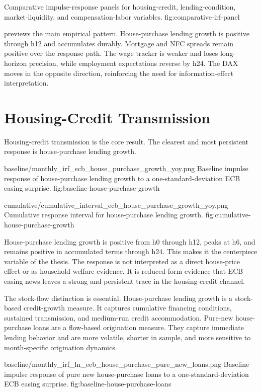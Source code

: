   {Comparative impulse-response panels for housing-credit, lending-condition, market-liquidity, and compensation-labor variables.}
  {fig:comparative-irf-panel}

 previews the main empirical pattern. House-purchase lending growth is positive through h12 and accumulates durably. Mortgage and NFC spreads remain positive over the response path. The wage tracker is weaker and loses long-horizon precision, while employment expectations reverse by h24. The DAX moves in the opposite direction, reinforcing the need for information-effect interpretation.

\section{Housing-Credit Transmission}

Housing-credit transmission is the core result. The clearest and most persistent response is house-purchase lending growth.

\thesisfigure
  {baseline/monthly_irf_ecb_house_purchase_growth_yoy.png}
  {Baseline impulse response of house-purchase lending growth to a one-standard-deviation ECB easing surprise.}
  {fig:baseline-house-purchase-growth}

\thesisfigure
  {cumulative/cumulative_interval_ecb_house_purchase_growth_yoy.png}
  {Cumulative response interval for house-purchase lending growth.}
  {fig:cumulative-house-purchase-growth}

House-purchase lending growth is positive from h0 through h12, peaks at h6, and remains positive in accumulated terms through h24. This makes it the centerpiece variable of the thesis. The response is not interpreted as a direct house-price effect or as household welfare evidence. It is reduced-form evidence that ECB easing news leaves a strong and persistent trace in the housing-credit channel.

The stock-flow distinction is essential. House-purchase lending growth is a stock-based credit-growth measure. It captures cumulative financing conditions, sustained transmission, and medium-run credit accommodation. Pure-new house-purchase loans are a flow-based origination measure. They capture immediate lending behavior and are more volatile, shorter in sample, and more sensitive to month-specific origination dynamics.

\thesisfigure
  {baseline/monthly_irf_ln_ecb_house_purchase_pure_new_loans.png}
  {Baseline impulse response of pure new house-purchase loans to a one-standard-deviation ECB easing surprise.}
  {fig:baseline-house-purchase-loans}

